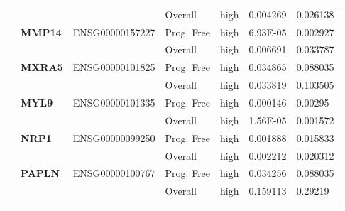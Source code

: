 \begin{spacing}{1}
{\begin{longtable}{%
            |>{\bfseries}p{2cm}|
            >{\bfseries}p{1.9cm}|
            >{\tiny}p{1.9cm}|
            p{2cm}|
            p{2cm}|
            p{1.5cm}|
            p{1.5cm}|
            }
            \hhline{~~~----}
             &          &                 & Overall    & high & 0.004269 & 0.026138 \\
            \hhline{~======}
             & MMP14    & ENSG00000157227 & Prog. Free & high & 6.93E-05 & 0.002927 \\
            \hhline{~~~----}
             &          &                 & Overall    & high & 0.006691 & 0.033787 \\
            \hhline{~======}
             & MXRA5    & ENSG00000101825 & Prog. Free & high & 0.034865 & 0.088035 \\
            \hhline{~~~----}
             &          &                 & Overall    & high & 0.033819 & 0.103505 \\
            \hhline{~======}
             & MYL9     & ENSG00000101335 & Prog. Free & high & 0.000146 & 0.00295  \\
            \hhline{~~~----}
             &          &                 & Overall    & high & 1.56E-05 & 0.001572 \\
            \hhline{~======}
             & NRP1     & ENSG00000099250 & Prog. Free & high & 0.001888 & 0.015833 \\
            \hhline{~~~----}
             &          &                 & Overall    & high & 0.002212 & 0.020312 \\
            \hhline{~======}
             & PAPLN    & ENSG00000100767 & Prog. Free & high & 0.034256 & 0.088035 \\
            \hhline{~~~----}
             &          &                 & Overall    & high & 0.159113 & 0.29219  \\
            \hhline{~======}


\end{longtable}}
\end{spacing}
